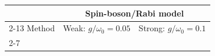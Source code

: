 \documentclass[
  reprint,
  amsmath,
  amssymb,
  aps,
  pra,
  nofootinbib,
  superscriptaddress,
  floatfix
]{revtex4-2}
\newcommand{\metrichead}[1]{\makebox[0.061\textwidth][c]{#1}}
\begin{document}
\begin{widetext}
\begin{minipage}{\textwidth}
\begin{center}
\footnotesize
\setlength{\tabcolsep}{1.15pt}
\renewcommand{\arraystretch}{1.08}
\begin{ruledtabular}
\begin{tabular}{p{}cccccc|cccccc}
& \multicolumn{12}{c}{Spin-boson/Rabi model}\\
\cline{2-13}
Method & \multicolumn{6}{c|}{Weak: $g/\omega_0=0.05$} & \multicolumn{6}{c}{Strong: $g/\omega_0=0.1$}\\
\cline{2-7}\cline{8-13}
 & \metrichead{$|\Delta E|$} & \metrichead{$1-F$} & \metrichead{$N_{2q}$} & \metrichead{$D_{2q}$} & \metrichead{$D_c$} & \metrichead{$S$} & \metrichead{$|\Delta E|$} & \metrichead{$1-F$} & \metrichead{$N_{2q}$} & \metrichead{$D_{2q}$} & \metrichead{$D_c$} & \metrichead{$S$}\\

\end{tabular}
\end{ruledtabular}
\end{center}
\end{minipage}
\end{widetext}
\end{document}
